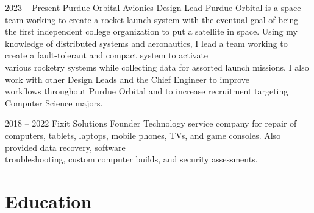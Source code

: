 \documentclass[
	10pt, %
]{FreemanCV}
\begin{document}
\begin{paracol}{2}

\jobentry
	{2023 -- Present} %
	{} %
	{Purdue Orbital} %
	{Avionics Design Lead} %
	{Purdue Orbital is a space team working to create a rocket launch system with the eventual goal of being the first independent college organization to put a satellite in space. Using my knowledge of distributed systems and aeronautics, I lead a team working to create a fault-tolerant and compact system to activate\\ various rocketry systems while collecting data for assorted launch missions. I also work with other Design Leads and the Chief Engineer to improve\\ workflows throughout Purdue Orbital and to increase recruitment targeting Computer Science majors.} %


\jobentry
	{2018 -- 2022} %
	{} %
	{Fixit Solutions} %
	{Founder} %
	{Technology service company for repair of computers, tablets, laptops, mobile phones, TVs, and game consoles. Also provided data recovery, software\\ troubleshooting, custom computer builds, and security assessments.} %


\section{Education}





\begin{supertabular}{r l} %


\end{supertabular}
\end{paracol}
\end{document}
